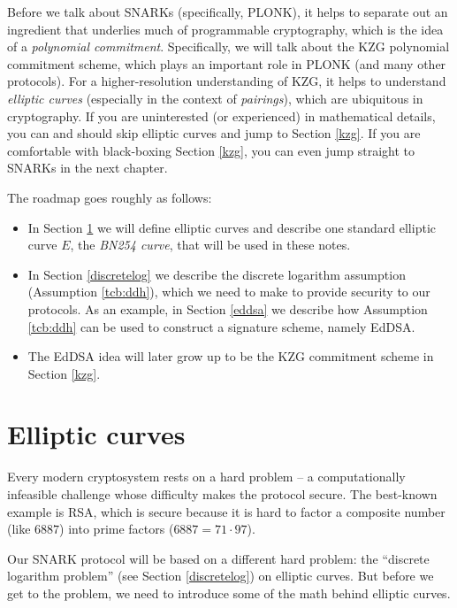 
Before we talk about SNARKs (specifically, PLONK), it helps to separate
out an ingredient that underlies much of programmable cryptography,
which is the idea of a \emph{polynomial commitment}. Specifically, we
will talk about the KZG polynomial commitment scheme, which plays an important
role in PLONK (and many other protocols). For a higher-resolution
understanding of KZG, it helps to understand \emph{elliptic curves}
(especially in the context of \emph{pairings}), which are ubiquitous in
cryptography. If you are uninterested (or experienced) in mathematical
details, you can and should skip elliptic curves and jump to Section \ref{kzg}.
If you are comfortable with black-boxing Section \ref{kzg}, you can even jump
straight to SNARKs in the next chapter.

The roadmap goes roughly as follows:

\begin{itemize}
\item In Section \ref{ec} we will define \alert{elliptic curves} and
  describe one standard elliptic curve $E$, the \emph{BN254 curve},
  that will be used in these notes.

\item In Section \ref{discretelog} we describe the
  \alert{discrete logarithm assumption} (Assumption \ref{tcb:ddh}),
  which we need to make to provide security to our protocols.
  As an example, in Section \ref{eddsa} we describe how
  Assumption \ref{tcb:ddh} can be used to construct a signature scheme,
  namely EdDSA.

\item The EdDSA idea will later grow up to be the KZG commitment scheme in
  Section \ref{kzg}.
\end{itemize}

\section{Elliptic curves}\label{ec}
Every modern cryptosystem rests on a hard problem -- a computationally
infeasible challenge whose difficulty makes the protocol secure. The
best-known example is RSA,
which is secure because it is hard to factor a composite number (like
$6887$) into prime factors ($6887 = 71 \cdot 97$).

Our SNARK protocol will be based on a different hard problem: the
``discrete logarithm problem''
(see Section \ref{discretelog}) on elliptic curves. But
before we get to the problem, we need to introduce some of the math
behind elliptic curves.

